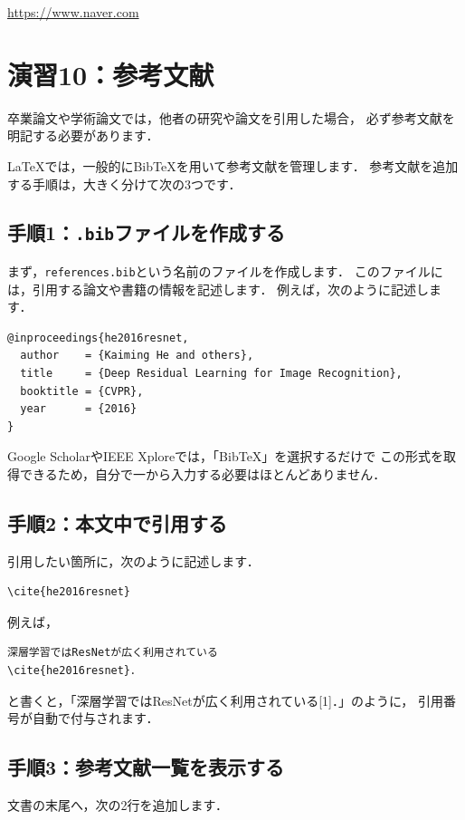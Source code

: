 \documentclass[a4paper,twocolumn]{jsarticle}
\begin{document}
\url{https://www.naver.com}

\section*{演習10：参考文献}
卒業論文や学術論文では，他者の研究や論文を引用した場合，
必ず参考文献を明記する必要があります．

LaTeXでは，一般的にBibTeXを用いて参考文献を管理します．
参考文献を追加する手順は，大きく分けて次の3つです．

\subsection*{手順1：\texttt{.bib}ファイルを作成する}
まず，\texttt{references.bib}という名前のファイルを作成します．
このファイルには，引用する論文や書籍の情報を記述します．
例えば，次のように記述します．

\begin{lstlisting}[language={}]
@inproceedings{he2016resnet,
  author    = {Kaiming He and others},
  title     = {Deep Residual Learning for Image Recognition},
  booktitle = {CVPR},
  year      = {2016}
}
\end{lstlisting}

Google ScholarやIEEE Xploreでは，「BibTeX」を選択するだけで
この形式を取得できるため，自分で一から入力する必要はほとんどありません．

\subsection*{手順2：本文中で引用する}
引用したい箇所に，次のように記述します．

\begin{verbatim}
\cite{he2016resnet}
\end{verbatim}

例えば，

\begin{verbatim}
深層学習ではResNetが広く利用されている
\cite{he2016resnet}．
\end{verbatim}

と書くと，「深層学習ではResNetが広く利用されている[1]．」のように，
引用番号が自動で付与されます．

\subsection*{手順3：参考文献一覧を表示する}
文書の末尾へ，次の2行を追加します．
\end{document}
